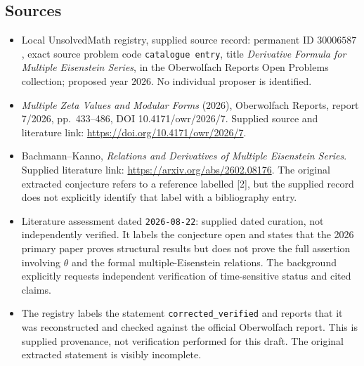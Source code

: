 \documentclass[11pt]{article}
\begin{document}
\subsection{Sources}
\begin{itemize}
\item Local UnsolvedMath registry, supplied source record: permanent ID \(30006587\), exact source problem code \texttt{catalogue entry}, title \emph{Derivative Formula for Multiple Eisenstein Series}, in the Oberwolfach Reports Open Problems collection; proposed year \(2026\). No individual proposer is identified.
\item \emph{Multiple Zeta Values and Modular Forms} (2026), Oberwolfach Reports, report 7/2026, pp.\ 433--486, DOI 10.4171/owr/2026/7. Supplied source and literature link: \url{https://doi.org/10.4171/owr/2026/7}.
\item Bachmann--Kanno, \emph{Relations and Derivatives of Multiple Eisenstein Series}. Supplied literature link: \url{https://arxiv.org/abs/2602.08176}. The original extracted conjecture refers to a reference labelled [2], but the supplied record does not explicitly identify that label with a bibliography entry.
\item Literature assessment dated \texttt{2026-08-22}: supplied dated curation, not independently verified. It labels the conjecture open and states that the 2026 primary paper proves structural results but does not prove the full assertion involving \(\theta\) and the formal multiple-Eisenstein relations. The background explicitly requests independent verification of time-sensitive status and cited claims.
\item The registry labels the statement \texttt{corrected\_verified} and reports that it was reconstructed and checked against the official Oberwolfach report. This is supplied provenance, not verification performed for this draft. The original extracted statement is visibly incomplete.
\end{itemize}
\end{document}
